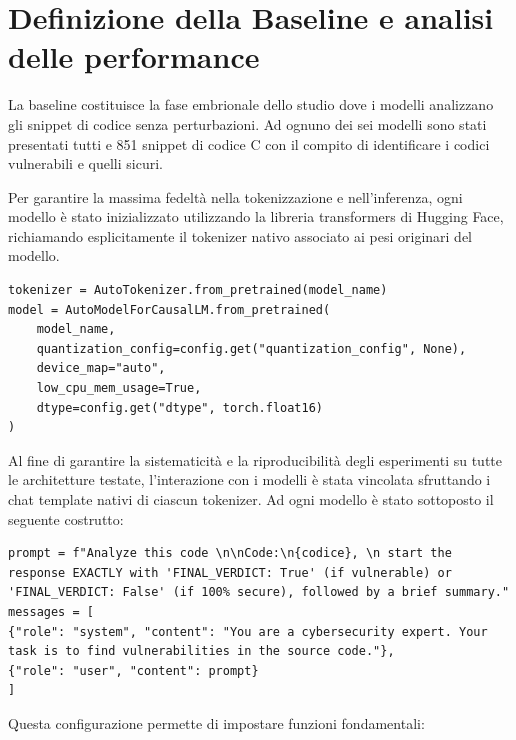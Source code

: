 \section{Definizione della Baseline e analisi delle performance}
La baseline costituisce la fase embrionale dello studio dove i modelli analizzano gli snippet di codice senza perturbazioni.
Ad ognuno dei sei modelli sono stati presentati tutti e 851 snippet di codice C con il compito di identificare i codici vulnerabili e quelli sicuri.

Per garantire la massima fedeltà nella tokenizzazione e nell'inferenza, ogni modello è stato inizializzato utilizzando la libreria transformers di Hugging Face, richiamando esplicitamente il tokenizer nativo associato ai pesi originari del modello.

\begin{verbatim}
tokenizer = AutoTokenizer.from_pretrained(model_name)
model = AutoModelForCausalLM.from_pretrained(
    model_name,
    quantization_config=config.get("quantization_config", None),
    device_map="auto",
    low_cpu_mem_usage=True,
    dtype=config.get("dtype", torch.float16)
)
\end{verbatim}

Al fine di garantire la sistematicità e la riproducibilità degli esperimenti su tutte le architetture testate, l'interazione con i modelli è stata vincolata sfruttando i chat template nativi di ciascun tokenizer.
Ad ogni modello è stato sottoposto il seguente costrutto:

\begin{verbatim}
prompt = f"Analyze this code \n\nCode:\n{codice}, \n start the response EXACTLY with 'FINAL_VERDICT: True' (if vulnerable) or 'FINAL_VERDICT: False' (if 100% secure), followed by a brief summary."
messages = [
{"role": "system", "content": "You are a cybersecurity expert. Your task is to find vulnerabilities in the source code."},
{"role": "user", "content": prompt}
]
\end{verbatim}

Questa configurazione permette di impostare funzioni fondamentali:

